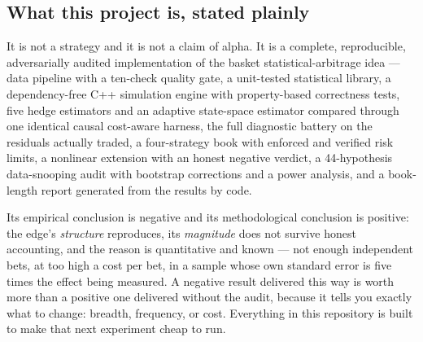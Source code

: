 \subsection{What this project is, stated plainly}

It is not a strategy and it is not a claim of alpha. It is a complete, reproducible,
adversarially audited implementation of the basket statistical-arbitrage idea --- data
pipeline with a ten-check quality gate, a unit-tested statistical library, a
dependency-free C++ simulation engine with property-based correctness tests, five hedge
estimators and an adaptive state-space estimator compared through one identical causal
cost-aware harness, the full diagnostic battery on the residuals actually traded, a
four-strategy book with enforced and verified risk limits, a nonlinear extension with an
honest negative verdict, a 44-hypothesis data-snooping audit with bootstrap corrections and
a power analysis, and a book-length report generated from the results by code.

Its empirical conclusion is negative and its methodological conclusion is positive: the
edge's \emph{structure} reproduces, its \emph{magnitude} does not survive honest
accounting, and the reason is quantitative and known --- not enough independent bets, at too
high a cost per bet, in a sample whose own standard error is five times the effect being
measured. A negative result delivered this way is worth more than a positive one delivered
without the audit, because it tells you exactly what to change: breadth, frequency, or
cost. Everything in this repository is built to make that next experiment cheap to run.
